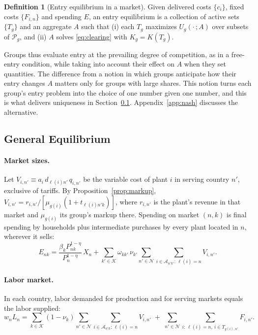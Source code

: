 \documentclass[11pt]{article}
\theoremstyle{definition}
\newtheorem{definition}{Definition}
\theoremstyle{remark}
\newcommand{\cN}{\mathcal N}
\newcommand{\cK}{\mathcal K}
\newcommand{\cP}{\mathcal P}
\newcommand{\cA}{\mathcal A}
\begin{document}
\begin{definition}[Entry equilibrium in a market]\label{def:entry}
Given delivered costs $\{c_i\}$, fixed costs $\{F_{i,n}\}$ and spending $E$, an entry
equilibrium is a collection of active sets $\{T_g\}$ and an aggregate $A$ such that
(i) each $T_g$ maximizes $U_g(\cdot\,;A)$ over subsets of $\cP_g$, and (ii) $A$ solves
\eqref{eq:clearing} with $K_g=K(T_g)$.
\end{definition}

\noindent Groups thus evaluate entry at the prevailing degree of competition, as in a
free-entry condition, while taking into account their effect on $A$ when they set
quantities. The difference from a notion in which groups anticipate how their entry
changes $A$ matters only for groups with large shares. This notion turns each group's
entry problem into the choice of one number given one number, and this is what delivers
uniqueness in Section~\ref{sec:ge}. Appendix~\ref{app:nash} discusses the alternative.

\subsection{General Equilibrium}
\label{sec:ge}

\paragraph{Market sizes.} Let $V_{i,n'}\equiv a_i\,d_{\ell(i)n'}\,q_{i,n'}$ be the
variable cost of plant $i$ in serving country $n'$, exclusive of tariffs. By
Proposition~\ref{prop:markup}, $V_{i,n'}=r_{i,n'}/[\mu_{g(i)}(1+t_{\ell(i)n'k})]$, where
$r_{i,n'}$ is the plant's revenue in that market and $\mu_{g(i)}$ its group's markup
there. Spending on market $(n,k)$ is final spending by households plus intermediate
purchases by every plant located in $n$, wherever it sells:
\begin{equation}
  E_{nk}=\frac{\beta_kP_{nk}^{1-\eta}}{P_n^{1-\eta}}\,X_n
  +\sum_{k'\in\cK}\omega_{kk'}\,\nu_{k'}\sum_{n'\in\cN}
   \sum_{i\in\cA_{n'k'}:\,\ell(i)=n}V_{i,n'}.
  \label{eq:spending}
\end{equation}

\paragraph{Labor market.} In each country, labor demanded for production and for
serving markets equals the labor supplied:
\begin{equation}
  w_nL_n=\sum_{k\in\cK}(1-\nu_k)\sum_{n'\in\cN}\sum_{i\in\cA_{n'k}:\,\ell(i)=n}V_{i,n'}
  \;+\;\sum_{n'\in\cN}\sum_{i:\,\ell(i)=n,\ i\in T_{g(i),n'}}F_{i,n'}.
  \label{eq:labor}
\end{equation}
\end{document}
